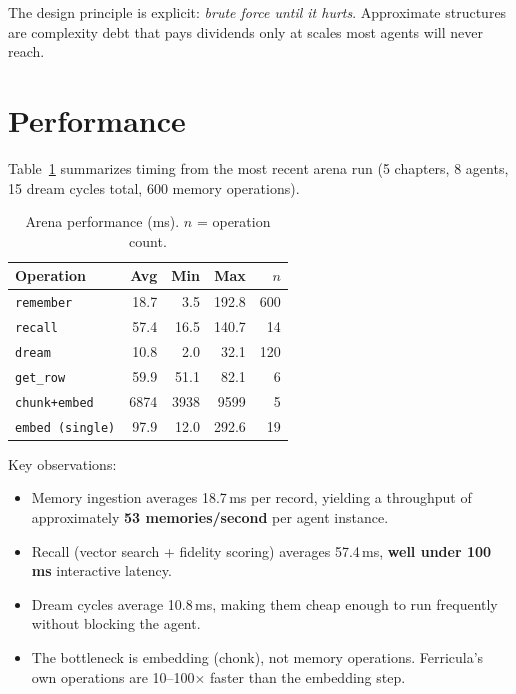 \documentclass[twocolumn,10pt]{article}
\begin{document}
\noindent
The design principle is explicit: \textit{brute force until it hurts}.
Approximate structures are complexity debt that pays dividends only at
scales most agents will never reach.

\section{Performance}

Table~\ref{tab:perf} summarizes timing from the most recent arena run
(5 chapters, 8 agents, 15 dream cycles total, 600 memory operations).

\begin{table}[h]
\centering
\caption{Arena performance (ms). $n$ = operation count.}
\label{tab:perf}
\footnotesize
\begin{tabular}{lrrrr}
\toprule
Operation & Avg & Min & Max & $n$ \\
\midrule
\texttt{remember}   & 18.7 &  3.5 & 192.8 & 600 \\
\texttt{recall}     & 57.4 & 16.5 & 140.7 &  14 \\
\texttt{dream}      & 10.8 &  2.0 &  32.1 & 120 \\
\texttt{get\_row}   & 59.9 & 51.1 &  82.1 &   6 \\
\texttt{chunk+embed} & 6874 & 3938 & 9599 &   5 \\
\texttt{embed (single)} & 97.9 & 12.0 & 292.6 & 19 \\
\bottomrule
\end{tabular}
\end{table}

\noindent
Key observations:

\begin{itemize}[leftmargin=*,itemsep=1pt]
\item Memory ingestion averages 18.7\,ms per record, yielding
  a throughput of approximately \textbf{53 memories/second} per
  agent instance.
\item Recall (vector search + fidelity scoring) averages 57.4\,ms,
  \textbf{well under 100\,ms} interactive latency.
\item Dream cycles average 10.8\,ms, making them cheap enough to
  run frequently without blocking the agent.
\item The bottleneck is embedding (chonk), not memory operations.
  Ferricula's own operations are 10--100$\times$ faster than the
  embedding step.
\end{itemize}
\end{document}
